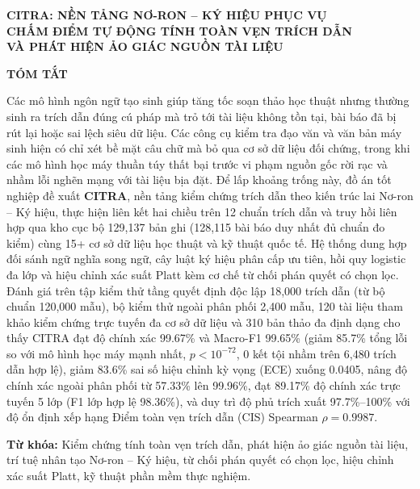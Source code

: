\clearpage
\pagestyle{empty}
{\centering
\thispagestyle{empty}
\linespread{1.15}\fontsize{16pt}{22pt}\selectfont\textbf{CITRA: NỀN TẢNG NƠ-RON -- KÝ HIỆU PHỤC VỤ\\CHẤM ĐIỂM TỰ ĐỘNG TÍNH TOÀN VẸN TRÍCH DẪN\\VÀ PHÁT HIỆN ẢO GIÁC NGUỒN TÀI LIỆU}\par}

\vspace{0.35\baselineskip}

{\centering\linespread{1.15}\fontsize{16pt}{22pt}\selectfont\textbf{TÓM TẮT}\par}

\vspace{0.45\baselineskip}
\thispagestyle{empty}

Các mô hình ngôn ngữ tạo sinh giúp tăng tốc soạn thảo học thuật nhưng thường sinh ra trích dẫn đúng cú pháp mà trỏ tới tài liệu không tồn tại, bài báo đã bị rút lại hoặc sai lệch siêu dữ liệu. Các công cụ kiểm tra đạo văn và văn bản máy sinh hiện có chỉ xét bề mặt câu chữ mà bỏ qua cơ sở dữ liệu đối chứng, trong khi các mô hình học máy thuần túy thất bại trước vi phạm nguồn gốc rời rạc và nhầm lỗi nghẽn mạng với tài liệu bịa đặt. Để lấp khoảng trống này, đồ án tốt nghiệp đề xuất \textbf{CITRA}, nền tảng kiểm chứng trích dẫn theo kiến trúc lai Nơ-ron -- Ký hiệu, thực hiện liên kết hai chiều trên 12 chuẩn trích dẫn và truy hồi liên hợp qua kho cục bộ 129,137 bản ghi (128,115 bài báo duy nhất đủ chuẩn đo kiểm) cùng 15+ cơ sở dữ liệu học thuật và kỹ thuật quốc tế. Hệ thống dung hợp đối sánh ngữ nghĩa song ngữ, cây luật ký hiệu phân cấp ưu tiên, hồi quy logistic đa lớp và hiệu chỉnh xác suất Platt kèm cơ chế từ chối phán quyết có chọn lọc. Đánh giá trên tập kiểm thử tầng quyết định độc lập 18,000 trích dẫn (từ bộ chuẩn 120,000 mẫu), bộ kiểm thử ngoài phân phối 2,400 mẫu, 120 tài liệu tham khảo kiểm chứng trực tuyến đa cơ sở dữ liệu và 310 bản thảo đa định dạng cho thấy CITRA đạt độ chính xác 99.67\% và Macro-F1 99.65\% (giảm 85.7\% tổng lỗi so với mô hình học máy mạnh nhất, $p < 10^{-72}$, 0 kết tội nhầm trên 6,480 trích dẫn hợp lệ), giảm 83.6\% sai số hiệu chỉnh kỳ vọng (ECE) xuống 0.0405, nâng độ chính xác ngoài phân phối từ 57.33\% lên 99.96\%, đạt 89.17\% độ chính xác trực tuyến 5 lớp (F1 lớp hợp lệ 98.36\%), và duy trì độ phủ trích xuất 97.7\%--100\% với độ ổn định xếp hạng Điểm toàn vẹn trích dẫn (CIS) Spearman $\rho = 0.9987$.

\vspace{0.35\baselineskip}
\noindent\textbf{Từ khóa:} Kiểm chứng tính toàn vẹn trích dẫn, phát hiện ảo giác nguồn tài liệu, trí tuệ nhân tạo Nơ-ron -- Ký hiệu, từ chối phán quyết có chọn lọc, hiệu chỉnh xác suất Platt, kỹ thuật phần mềm thực nghiệm.
\clearpage
